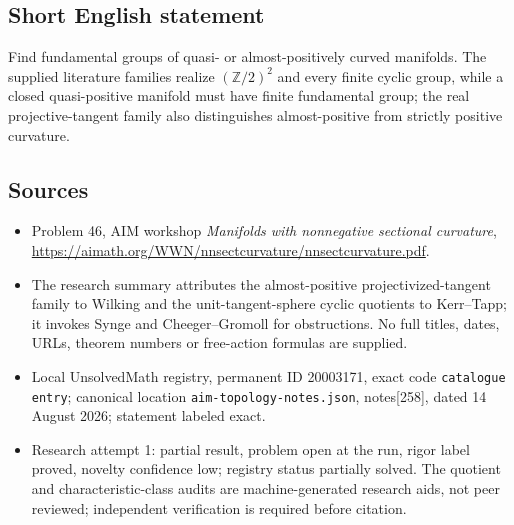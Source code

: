 \documentclass[11pt]{article}
\newcommand{\Z}{\mathbb{Z}}
\begin{document}
\subsection{Short English statement}
Find fundamental groups of quasi- or almost-positively curved manifolds. The supplied literature families realize \((\Z/2)^2\) and every finite cyclic group, while a closed quasi-positive manifold must have finite fundamental group; the real projective-tangent family also distinguishes almost-positive from strictly positive curvature.
\subsection{Sources}
\begin{itemize}
\item Problem 46, AIM workshop \emph{Manifolds with nonnegative sectional curvature}, \url{https://aimath.org/WWN/nnsectcurvature/nnsectcurvature.pdf}.
\item The research summary attributes the almost-positive projectivized-tangent family to Wilking and the unit-tangent-sphere cyclic quotients to Kerr--Tapp; it invokes Synge and Cheeger--Gromoll for obstructions. No full titles, dates, URLs, theorem numbers or free-action formulas are supplied.
\item Local UnsolvedMath registry, permanent ID 20003171, exact code \texttt{catalogue entry}; canonical location \texttt{aim-topology-notes.json}, notes[258], dated 14 August 2026; statement labeled exact.
\item Research attempt 1: partial result, problem open at the run, rigor label proved, novelty confidence low; registry status partially solved. The quotient and characteristic-class audits are machine-generated research aids, not peer reviewed; independent verification is required before citation.
\end{itemize}
\end{document}
